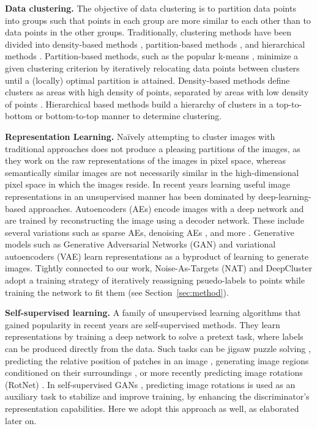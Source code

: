 \documentclass[a4paper,conference]{IEEEtran}
\begin{document}
\textbf{Data clustering.}
The objective of data clustering is to partition data points into groups such that points in each group are more similar to each other than to data points in the other groups. Traditionally, clustering methods have been divided into density-based methods \cite{kriegel2011density}, partition-based methods \cite{gerlhof1993partition}, and hierarchical methods \cite{duda1973pattern}. Partition-based methods, such as the popular k-means \cite{4031353,kmeansplus}, minimize a given clustering criterion by iteratively relocating data points between clusters until a (locally) optimal partition is attained. Density-based methods define clusters as areas with high density of points, separated by areas with low density of points \cite{DBSCAN}. Hierarchical based methods build a hierarchy of clusters in a top-to-bottom \cite{roux2015comparative} or bottom-to-top \cite{Gowda1978AgglomerativeCU} manner to determine clustering.

\textbf{Representation Learning.} Na\"ively attempting to cluster images with traditional approaches does not produce a pleasing partitions of the images, as they work on the raw representations of the images in pixel space, whereas semantically similar images are not necessarily similar in the high-dimensional pixel space in which the images reside. In recent years learning useful image representations in an unsupervised manner has been dominated by deep-learning-based approaches. Autoencoders (AEs) \cite{bengio2007} encode images with a deep network and are trained by reconstructing the image using a decoder network. These include several variations such as sparse AEs, denoising AEs \cite{denoiseae}, and more \cite{Masci2011StackedCA,SWWAE}. Generative models such as Generative Adversarial Networks (GAN) \cite{Goodfellow2014} and variational autoencoders (VAE) \cite{aevb} learn representations as a byproduct of learning to generate images. Tightly connected to our work, Noise-As-Targets (NAT) \cite{BJ2017} and DeepCluster \cite{caron2018deep} adopt a training strategy of iteratively reassigning psuedo-labels to points while training the network to fit them (see Section~\ref{sec:method}).

\textbf{Self-supervised learning.} A family of unsupervised learning algorithms that gained popularity in recent years are self-supervised methods. They learn representations by training a deep network to solve a pretext task, where labels can be produced directly from the data. Such tasks can be jigsaw puzzle solving \cite{Noroozi2016UnsupervisedLO}, predicting the relative position of patches in an image \cite{Doersch2015UnsupervisedVR}, generating image regions conditioned on their surroundings \cite{inpaintpathak2016}, or more recently predicting image rotations (RotNet) \cite{gidaris2018unsupervised}. In self-supervised GANs \cite{chen2018ssgan}, predicting image rotations is used as an auxiliary task to stabilize and improve training, by enhancing the discriminator's representation capabilities. Here we adopt this approach as well, as elaborated later on.
\end{document}
